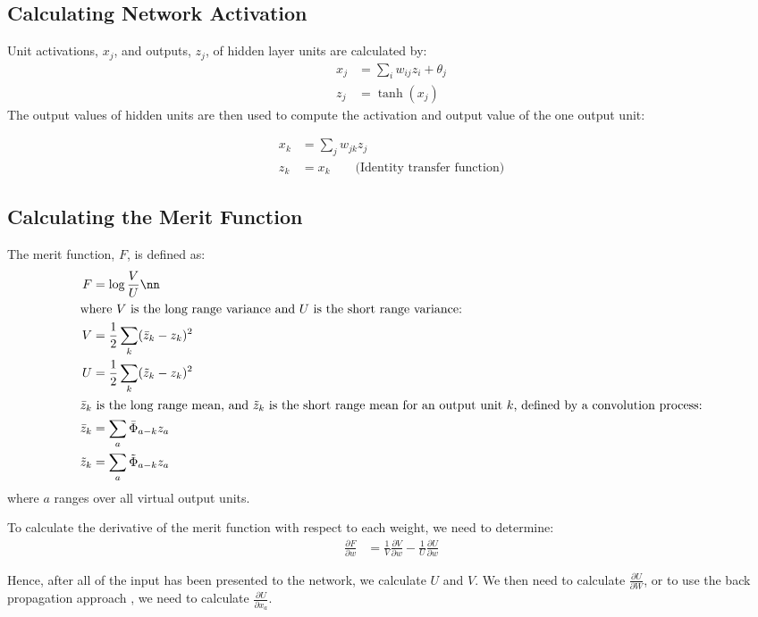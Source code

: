 \documentclass[a4paper]{article}
\newcommand{\zbar}{\bar{z}}
\newcommand{\ztilde}{\tilde{z}}
\newcommand{\lkernel}{\bar{\Phi}}
\newcommand{\skernel}{\tilde{\Phi}}
\newcommand{\pdiff}[2]{ \frac{\partial #1}{\partial #2}}
\begin{document}
\subsection{Calculating Network Activation}
\label{sec:activation}
Unit activations, $x_j$, and outputs, $z_j$, of hidden layer units
are calculated by:
\begin{align*}
  x_j &= \sum_i w_{ij} z_i + \theta_j \\
  z_j &= \tanh(x_j)
\end{align*}
The output values of hidden units are then used to compute the
activation and output value of the one output unit:

\begin{align*}
  x_k &= \sum_j w_{jk} z_j \\
  z_k &= x_k \qquad \text{(Identity transfer function)}
\end{align*}



\subsection{Calculating the Merit Function}
\label{sec:merit}
The merit function, $F$, is defined as:
\begin{align}
  F &= \log \frac{V}{U} \nn \\
\intertext{where $V$ is the long range variance and $U$ is the short
  range variance:}
V & = \frac{1}{2} \sum_k ( \zbar_k - z_k ) ^2  \label{eqn:v} \\
U & = \frac{1}{2} \sum_k ( \ztilde_k - z_k ) ^2  \label{eqn:u} \\
\intertext{$\zbar_k$ is the long range mean, and $\ztilde_k$ is the short
  range mean for an output unit $k$, defined by a convolution process:}
\zbar_k  &= \sum_a \lkernel_{a-k} z_a \\
\ztilde_k  &= \sum_a \skernel_{a-k} z_a
\end{align}
where $a$ ranges over all virtual output units.

To calculate the derivative of the merit function with respect to each
weight, we need to determine:
\begin{align*}
\pdiff{F}{w} &= \frac{1}{V} \pdiff{V}{w} - \frac{1}{U} \pdiff{U}{w}
\end{align*}

Hence, after all of the input has been presented to the network, we
calculate $U$ and $V$.  We then need to calculate $\pdiff{U}{W}$, or
to use the back propagation approach \cite{rumelhart86}, we need to calculate
$\pdiff{U}{x_a}$.
\end{document}
